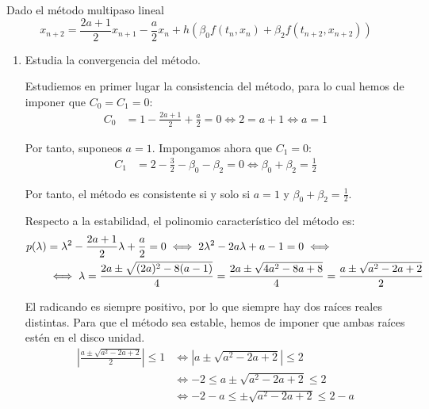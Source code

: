 \begin{ejercicio}
    Dado el método multipaso lineal
    \begin{equation*}
        x_{n+2} = \frac{2a + 1}{2} x_{n+1} - \frac{a}{2} x_n + h \left( \beta_0 f(t_n, x_n) + \beta_2 f(t_{n+2}, x_{n+2}) \right)
    \end{equation*}
    \begin{enumerate}
        \item Estudia la convergencia del método.
        
        Estudiemos en primer lugar la consistencia del método, para lo cual hemos de imponer que $C_0=C_1=0$:
        \begin{align*}
            C_0 &= 1 - \frac{2a + 1}{2} + \frac{a}{2} = 0 \iff 2 = a+1\iff a = 1
        \end{align*}

        Por tanto, suponeos $a=1$. Impongamos ahora que $C_1=0$:
        \begin{align*}
            C_1 &= 2 - \frac{3}{2} - \beta_0 - \beta_2 = 0 \iff \beta_0 + \beta_2 = \frac{1}{2}
        \end{align*}

        Por tanto, el método es consistente si y solo si $a=1$ y $\beta_0 + \beta_2 = \frac{1}{2}$.

        Respecto a la estabilidad, el polinomio característico del método es:
        \begin{align*}
            p(\lambda) &= \lambda^2 - \frac{2a + 1}{2}\lambda + \frac{a}{2} = 0\iff
            2\lambda^2 -2a\lambda + a-1 = 0
            \iff \\ &\iff
            \lambda = \frac{2a \pm \sqrt{(2a)^2 - 8(a-1)}}{4} = \frac{2a \pm \sqrt{4a^2 - 8a + 8}}{4} = \frac{a \pm \sqrt{a^2 - 2a + 2}}{2}
        \end{align*}

        El radicando es siempre positivo, por lo que siempre hay dos raíces reales distintas. Para que el método sea estable, hemos de imponer que ambas raíces estén en el disco unidad.
        \begin{align*}
            \left|\frac{a \pm \sqrt{a^2 - 2a + 2}}{2}\right| \leq 1 & \iff \left|a \pm \sqrt{a^2 - 2a + 2}\right| \leq 2
            \\ &\iff -2 \leq a \pm \sqrt{a^2 - 2a + 2} \leq 2
            \\ &\iff -2-a \leq \pm \sqrt{a^2 - 2a + 2} \leq 2-a
        \end{align*}


\end{enumerate}
\end{ejercicio}
